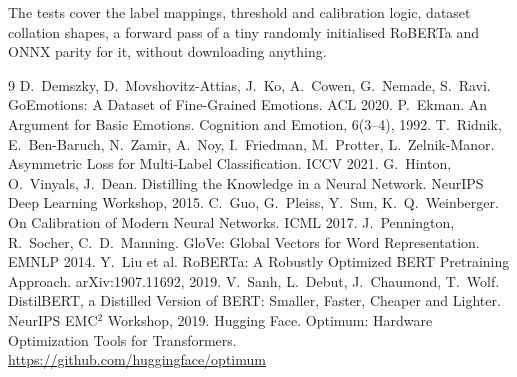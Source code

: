 \documentclass[11pt,a4paper]{article}
\begin{document}
The tests cover the label mappings, threshold and calibration logic, dataset collation shapes, a forward pass
of a tiny randomly initialised RoBERTa and ONNX parity for it, without downloading anything.

\begin{thebibliography}{9}
\small
{} D.~Demszky, D.~Movshovitz-Attias, J.~Ko, A.~Cowen, G.~Nemade, S.~Ravi. GoEmotions: A
Dataset of Fine-Grained Emotions. ACL 2020.
 P.~Ekman. An Argument for Basic Emotions. Cognition and Emotion, 6(3--4), 1992.
 T.~Ridnik, E.~Ben-Baruch, N.~Zamir, A.~Noy, I.~Friedman, M.~Protter, L.~Zelnik-Manor. Asymmetric
Loss for Multi-Label Classification. ICCV 2021.
 G.~Hinton, O.~Vinyals, J.~Dean. Distilling the Knowledge in a Neural Network. NeurIPS Deep
Learning Workshop, 2015.
 C.~Guo, G.~Pleiss, Y.~Sun, K.~Q.~Weinberger. On Calibration of Modern Neural Networks. ICML 2017.
 J.~Pennington, R.~Socher, C.~D.~Manning. GloVe: Global Vectors for Word Representation. EMNLP
2014.
 Y.~Liu et al. RoBERTa: A Robustly Optimized BERT Pretraining Approach. arXiv:1907.11692, 2019.
 V.~Sanh, L.~Debut, J.~Chaumond, T.~Wolf. DistilBERT, a Distilled Version of BERT: Smaller,
Faster, Cheaper and Lighter. NeurIPS EMC$^2$ Workshop, 2019.
 Hugging Face. Optimum: Hardware Optimization Tools for Transformers.\\
\url{https://github.com/huggingface/optimum}
\end{thebibliography}
\end{document}
